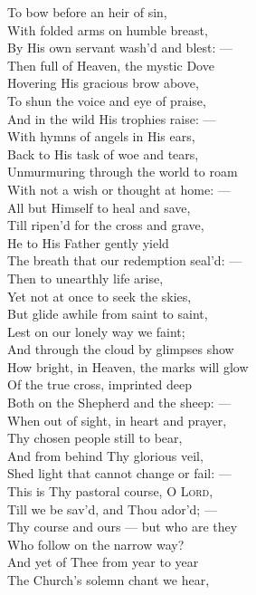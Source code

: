  To bow before an heir of sin, \\
 With folded arms on humble breast, \\
 By His own servant wash’d and blest: — \\
  Then full of Heaven, the mystic Dove \\
 Hovering His gracious brow above, \\
 To shun the voice and eye of praise, \\
 And in the wild His trophies raise: — \\
  With hymns of angels in His ears, \\
 Back to His task of woe and tears, \\
 Unmurmuring through the world to roam \\
 With not a wish or thought at home: — \\
  All but Himself to heal and save, \\
 Till ripen’d for the cross and grave, \\
 He to His Father gently yield \\
 The breath that our redemption seal’d: — \\
  Then to unearthly life arise, \\
 Yet not at once to seek the skies, \\
 But glide awhile from saint to saint, \\
 Lest on our lonely way we faint; \\
  And through the cloud by glimpses show \\
 How bright, in Heaven, the marks will glow \\
 Of the true cross, imprinted deep \\
 Both on the Shepherd and the sheep: — \\
  When out of sight, in heart and prayer, \\
 Thy chosen people still to bear, \\
 And from behind Thy glorious veil, \\
 Shed light that cannot change or fail: — \\
  This is Thy pastoral course, O \textsc{Lord}, \\
 Till we be sav’d, and Thou ador’d; — \\
 Thy course and ours — but who are they \\
 Who follow on the narrow way? \\
  And yet of Thee from year to year \\
 The Church’s solemn chant we hear, \\
